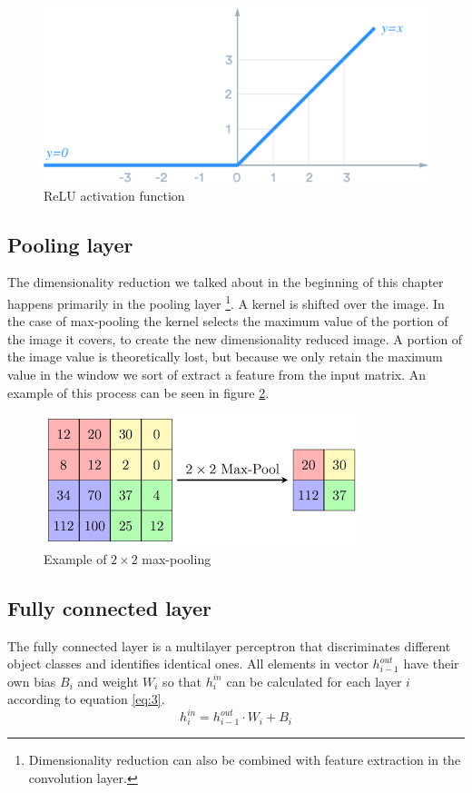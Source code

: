 \begin{figure}[H]
  \center
  \includegraphics[scale=0.3]{plots/relu.png}
  \caption{ReLU activation function}
  \label{fig:relu}
\end{figure}

\subsection{Pooling layer}
The dimensionality reduction we talked about in the beginning of this chapter happens primarily in the pooling layer \footnote{Dimensionality reduction can also be combined with feature extraction in the convolution layer.}. A kernel is shifted over the image. In the case of max-pooling the kernel selects the maximum value of the portion of the image it covers, to create the new dimensionality reduced image. A portion of the image value is theoretically lost, but because we only retain the maximum value in the window we sort of extract a feature from the input matrix. An example of this process can be seen in figure \ref{fig:pooling}.
\begin{figure}[H]
  \center
  \includegraphics[scale=0.75]{fig/maxpool.png}
  \caption{Example of $2\times2$ max-pooling}
  \label{fig:pooling}
\end{figure}

\subsection{Fully connected layer}
The fully connected layer is a multilayer perceptron that discriminates different object classes and identifies identical ones. All elements in vector $h_{i-1}^{out}$ have their own bias $B_i$ and weight $W_i$ so that $h_i^{in}$ can be calculated for each layer $i$ according to equation \ref{eq:3}.
\begin{equation} \label{eq:3}
  h_i^{in} = h_{i-1}^{out} \cdot W_i + B_i
\end{equation}

